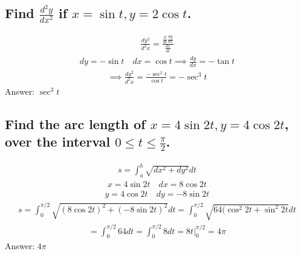 \documentclass{article}
\begin{document}
\subsection{Find $\frac{d^2y}{dx^2}$ if $x = \sin{t}, y = 2\cos{t}$.}
\begin{align*}
	\frac{dy^2}{d^2x} = \frac{\frac{d}{dt} \frac{dy}{dx}}{\frac{dx}{dt}}
\end{align*}
\begin{align*}
	dy = -\sin{t} \quad dx = \cos{t} \implies \frac{dy}{dx} = -\tan{t}
\end{align*}
\begin{align*}
	\implies \frac{dy^2}{d^2x} = \frac{-\sec^2{t}}{\cos{t}} = -\sec^3{t}
\end{align*}
Answer: $\sec^3{t}$

\subsection{Find the arc length of $x = 4\sin{2t}, y = 4\cos{2t}$, over the interval $0 \leq t \leq \frac{\pi}{2}$.}
\begin{align*}
	s = \int_a^b {\sqrt{dx^2 + dy^2}}dt
\end{align*}
\begin{align*}
	x = 4\sin{2t} \quad dx = 8\cos{2t}
\end{align*}
\begin{align*}
	y = 4\cos{2t} \quad dy = -8\sin{2t}
\end{align*}
\begin{align*}
	s = \int_0^{\pi/2} {\sqrt{(8\cos{2t})^2 + (-8\sin{2t})^2}}dt = \int_0^{\pi/2} {\sqrt{64(\cos^2{2t} + \sin^2{2t}}}dt
\end{align*}
\begin{align*}
	= \int_0^{\pi/2} {64}dt = \int_0^{\pi/2} {8}dt = 8t \bigg|_0^{\pi/2} = 4\pi
\end{align*}
Answer: $4\pi$

\end{document}
